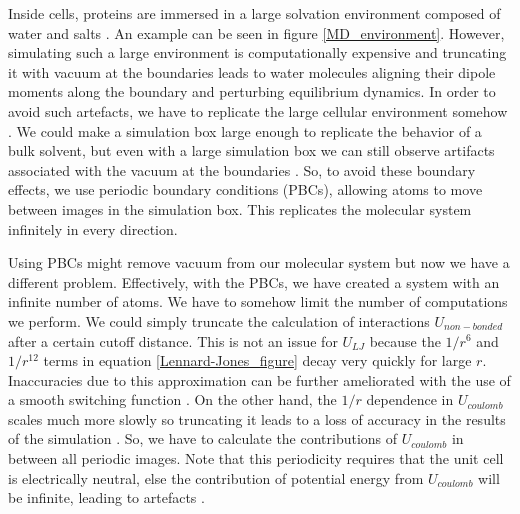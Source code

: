 Inside cells, proteins are immersed in a large solvation environment composed of water and salts \cite{phillips2012}. An example can be seen in figure \ref{MD_environment}. However, simulating such a large environment is computationally expensive and truncating it with vacuum at the boundaries leads to water molecules aligning their dipole moments along the boundary and perturbing equilibrium dynamics. In order to avoid such artefacts, we have to replicate the large cellular environment somehow \cite{ross2018}. We could make a simulation box large enough to replicate the behavior of a bulk solvent, but even with a large simulation box we can still observe artifacts associated with the vacuum at the boundaries \cite{gapsys2020}. So, to avoid these boundary effects, we use periodic boundary conditions (PBCs), allowing atoms to move between images in the simulation box. This replicates the molecular system infinitely in every direction. 

Using PBCs might remove vacuum from our molecular system but now we have a different problem. Effectively, with the PBCs, we have created a system with an infinite number of atoms. We have to somehow limit the number of computations we perform. We could simply truncate the calculation of interactions $U_{non-bonded}$ after a certain cutoff distance. This is not an issue for $U_{LJ}$ because the $1/r^6$ and $1/r^{12}$ terms in equation \ref{Lennard-Jones_figure} decay very quickly for large $r$. Inaccuracies due to this approximation can be further ameliorated with the use of a smooth switching function \cite{klauda2007, venable2009}. On the other hand, the $1/r$ dependence in $U_{coulomb}$ scales much more slowly so truncating it leads to a loss of accuracy in the results of the simulation \cite{auffinger1995, perera1995, roberts1994, delbuono1996, essmann1995}. So, we have to calculate the contributions of $U_{coulomb}$ in between all periodic images. Note that this periodicity requires that the unit cell is electrically neutral, else the contribution of potential energy from $U_{coulomb}$ will be infinite, leading to artefacts \cite{hub2014}.

